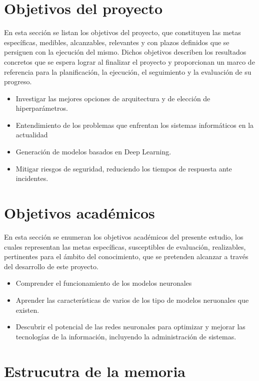  
\section{Objetivos del proyecto} \label{sec.objetivos-pro}
En esta sección se listan los objetivos del proyecto, que constituyen las metas específicas, medibles, alcanzables, relevantes y con plazos definidos que se persiguen con la ejecución del mismo. Dichos objetivos describen los resultados concretos que se espera lograr al finalizar el proyecto y proporcionan un marco de referencia para la planificación, la ejecución, el seguimiento y la evaluación de su progreso.

\begin{itemize}
\item Investigar las mejores opciones de arquitectura y de elección de hiperparámetros.
\item Entendimiento de los problemas que enfrentan los sistemas informáticos en la actualidad
\item Generación de modelos basados en Deep Learning.
\item Mitigar riesgos de seguridad, reduciendo los tiempos de respuesta ante incidentes.

\end{itemize}


\section{Objetivos académicos} \label{sec.objetivos-aca}
En esta sección se enumeran los objetivos académicos del presente estudio, los cuales representan las metas específicas, susceptibles de evaluación, realizables, pertinentes para el ámbito del conocimiento, que se pretenden alcanzar a través del desarrollo de este proyecto. 

\begin{itemize}
\item Comprender el funcionamiento de los modelos neuronales
\item Aprender las características de varios de los tipo de modelos neruonales que existen.
\item Descubrir el potencial de las redes neuronales para optimizar y mejorar las tecnologías de la información, incluyendo la administración de sistemas.
\end{itemize}


\section{Estrucutra de la memoria} \label{sec.estr-memoria}

